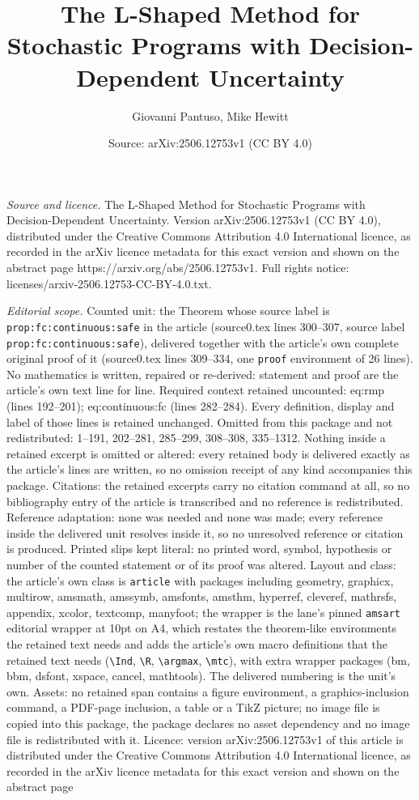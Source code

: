 \documentclass[10pt,a4paper]{amsart}
\title[The L-Shaped Method for Stochastic Programs with Decision-De]{The L-Shaped Method for Stochastic Programs with Decision-Dependent Uncertainty}
\author{Giovanni Pantuso, Mike Hewitt}
\date{Source: arXiv:2506.12753v1 (CC BY 4.0)}
\begin{document}
\maketitle

\noindent\emph{Source and licence.} The L-Shaped Method for Stochastic Programs with Decision-Dependent Uncertainty. Version arXiv:2506.12753v1 (CC BY 4.0), distributed under the Creative Commons Attribution 4.0 International licence, as recorded in the arXiv licence metadata for this exact version and shown on the abstract page https://arxiv.org/abs/2506.12753v1. Full rights notice: licenses/arxiv-2506.12753-CC-BY-4.0.txt.\par\smallskip

\noindent\textit{Editorial scope.} Counted unit: the Theorem whose source label is \texttt{prop:fc:continuous:safe} in the article (source0.tex lines 300--307, source label \texttt{prop:fc:continuous:safe}), delivered together with the article's own complete original proof of it (source0.tex lines 309--334, one \texttt{proof} environment of 26 lines). No mathematics is written, repaired or re-derived: statement and proof are the article's own text line for line. Required context retained uncounted: eq:rmp (lines 192--201); eq:continuous:fc (lines 282--284). Every definition, display and label of those lines is retained unchanged. Omitted from this package and not redistributed: 1--191, 202--281, 285--299, 308--308, 335--1312. Nothing inside a retained excerpt is omitted or altered: every retained body is delivered exactly as the article's lines are written, so no omission receipt of any kind accompanies this package. Citations: the retained excerpts carry no citation command at all, so no bibliography entry of the article is transcribed and no reference is redistributed. Reference adaptation: none was needed and none was made; every reference inside the delivered unit resolves inside it, so no unresolved reference or citation is produced. Printed slips kept literal: no printed word, symbol, hypothesis or number of the counted statement or of its proof was altered. Layout and class: the article's own class is \texttt{article} with packages including geometry, graphicx, multirow, amsmath, amssymb, amsfonts, amsthm, hyperref, cleveref, mathrsfs, appendix, xcolor, textcomp, manyfoot; the wrapper is the lane's pinned \texttt{amsart} editorial wrapper at 10pt on A4, which restates the theorem-like environments the retained text needs and adds the article's own macro definitions that the retained text needs (\texttt{\textbackslash Ind}, \texttt{\textbackslash R}, \texttt{\textbackslash argmax}, \texttt{\textbackslash mtc}), with extra wrapper packages (bm, bbm, dsfont, xspace, cancel, mathtools). The delivered numbering is the unit's own. Assets: no retained span contains a figure environment, a graphics-inclusion command, a PDF-page inclusion, a table or a TikZ picture; no image file is copied into this package, the package declares no asset dependency and no image file is redistributed with it. Licence: version arXiv:2506.12753v1 of this article is distributed under the Creative Commons Attribution 4.0 International licence, as recorded in the arXiv licence metadata for this exact version and shown on the abstract page 
\end{document}
